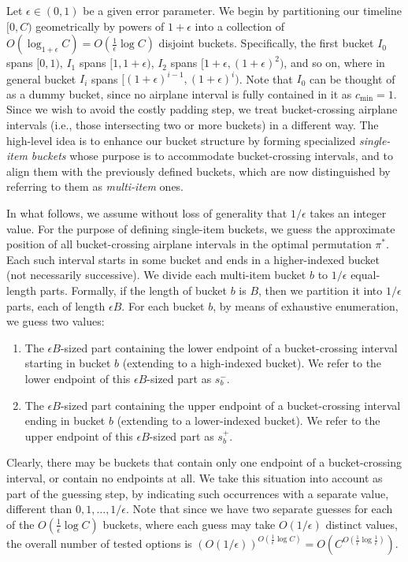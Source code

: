 \documentclass[11pt]{article}
\theoremstyle{plain}
\theoremstyle{definition}
\begin{document}
\smallskip {} Let $\epsilon \in (0,1)$ be a given error parameter. We begin by partitioning our timeline $[0,C)$ geometrically by powers of $1+\epsilon$ into a collection of $O( \log_{1+\epsilon} C) = O( \frac{ 1 }{ \epsilon }\log C)$ disjoint buckets. Specifically, the first bucket $I_0$ spans $[0,1)$, $I_1$ spans $[1,1+\epsilon)$, $I_2$ spans $[1+\epsilon,(1+\epsilon)^2)$, and so on, where in general bucket $I_i$ spans $[(1+\epsilon)^{i-1},(1+\epsilon)^i)$. Note that $I_0$ can be thought of as a dummy bucket, since no airplane interval is fully contained in it as $c_{\min} = 1$. Since we wish to avoid the costly padding step, we treat bucket-crossing airplane intervals (i.e., those intersecting two or more buckets) in a different way. The high-level idea is to enhance our bucket structure by forming specialized \textit{single-item buckets} whose purpose is to accommodate bucket-crossing intervals, and to align them with the previously defined buckets, which are now distinguished by referring to them as \textit{multi-item} ones.

\smallskip {} In what follows, we assume without loss of generality that $1/\epsilon$ takes an integer value. For the purpose of defining single-item buckets, we guess the approximate position of all bucket-crossing airplane intervals in the optimal permutation $\pi^*$. Each such interval starts in some bucket and ends in a higher-indexed bucket (not necessarily successive). We divide each multi-item bucket $b$ to $1/\epsilon$ equal-length parts. Formally, if the length of bucket $b$ is $B$, then we partition it into $1/\epsilon$ parts, each of length $\epsilon B$. For each bucket $b$, by means of exhaustive enumeration, we guess two values:
\begin{enumerate}
\item The $\epsilon B$-sized part containing the lower endpoint of a bucket-crossing interval starting in bucket $b$ (extending to a high-indexed bucket). We refer to the lower endpoint of this $\epsilon B$-sized part as $s_b^-$.

\item The $\epsilon B$-sized part containing the upper endpoint of a bucket-crossing interval ending in bucket $b$ (extending to a lower-indexed bucket). We refer to the upper endpoint of this $\epsilon B$-sized part as $s_b^+$.
\end{enumerate}
Clearly, there may be buckets that contain only one endpoint of a bucket-crossing interval, or contain no endpoints at all. We take this situation into account as part of the guessing step, by indicating such occurrences with a separate value, different than $0, 1, \ldots, 1/\epsilon$. Note that since we have two separate guesses for each of the $O( \frac{ 1 }{ \epsilon }\log C)$ buckets, where each guess may take $O( 1/\epsilon )$ distinct values, the overall number of tested options is $( O( 1/\epsilon ) )^{ O( \frac{ 1 }{ \epsilon }\log C) } = O( C^{ O( \frac{ 1 }{ \epsilon } \log \frac{ 1 }{ \epsilon } ) } )$.
\end{document}
